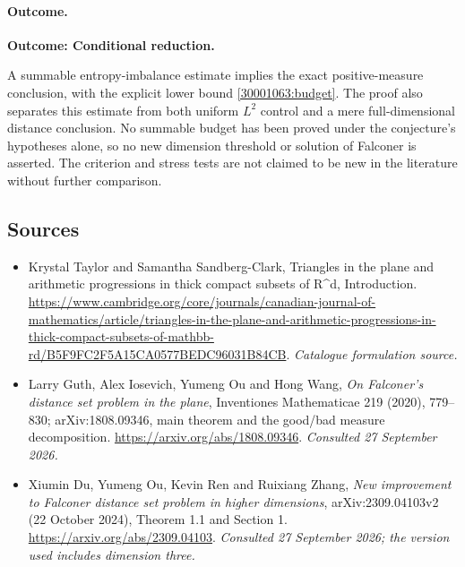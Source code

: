 \documentclass[11pt,a4paper]{article}
\begin{document}
\paragraph{Outcome.}
\textbf{Outcome: Conditional reduction.}

A summable entropy-imbalance estimate implies the exact positive-measure
conclusion, with the explicit lower bound \eqref{30001063:budget}. The proof
also separates this estimate from both uniform $L^2$ control and a mere
full-dimensional distance conclusion. No summable budget has been proved
under the conjecture's hypotheses alone, so no new dimension threshold or
solution of Falconer is asserted. The criterion and stress tests are
not claimed to be new in the literature without further comparison.
\subsection{Sources}
\begin{itemize}\raggedright
\item[\textnormal{[S1]}]\hypertarget{source:30001063:1}{} Krystal Taylor and Samantha Sandberg-Clark, Triangles in the plane and arithmetic progressions in thick compact subsets of R\textasciicircum{}d, Introduction.
\url{https://www.cambridge.org/core/journals/canadian-journal-of-mathematics/article/triangles-in-the-plane-and-arithmetic-progressions-in-thick-compact-subsets-of-mathbb-rd/B5F9FC2F5A15CA0577BEDC96031B84CB}.
{\small\textit{Catalogue formulation source.}}
\item[\textnormal{[E1]}]\hypertarget{extra:30001063:1}{} Larry Guth, Alex Iosevich, Yumeng Ou and Hong Wang,
\emph{On Falconer's distance set problem in the plane}, Inventiones Mathematicae
219 (2020), 779--830; arXiv:1808.09346, main theorem and the good/bad measure decomposition.
\url{https://arxiv.org/abs/1808.09346}.
{\small\textit{Consulted 27 September 2026.}}
\item[\textnormal{[E2]}]\hypertarget{extra:30001063:2}{} Xiumin Du, Yumeng Ou, Kevin Ren and Ruixiang Zhang,
\emph{New improvement to Falconer distance set problem in higher dimensions},
arXiv:2309.04103v2 (22 October 2024), Theorem 1.1 and Section 1.
\url{https://arxiv.org/abs/2309.04103}.
{\small\textit{Consulted 27 September 2026; the version used includes dimension three.}}
\end{itemize}
\end{document}

